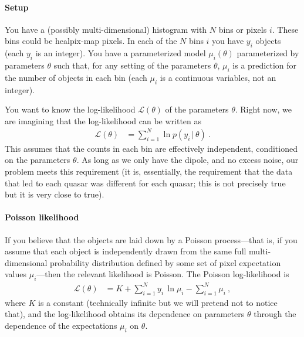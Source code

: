 \documentclass{article}
\newcommand{\given}{\,|\,}
\begin{document}
\paragraph{Setup}
You have a (possibly multi-dimensional) histogram with $N$ bins or pixels $i$.
These bins could be healpix-map pixels.
In each of the $N$ bins $i$ you have $y_i$ objects (each $y_i$ is an integer).
You have a parameterized model $\mu_i(\theta)$ parameterized by parameters $\theta$ such that, for any setting of the parameters $\theta$, $\mu_i$ is a prediction for the number of objects in each bin (each $\mu_i$ is a continuous variables, not an integer).

You want to know the log-likelihood $\mathscr{L}(\theta)$ of the parameters $\theta$.
Right now, we are imagining that the log-likelihood can be written as
\begin{align}
    \mathscr{L}(\theta) &= \sum_{i=1}^N \ln p(y_i\given\theta) ~.
\end{align}
This assumes that the counts in each bin are effectively independent, conditioned on the parameters $\theta$.
As long as we only have the dipole, and no excess noise, our problem meets this requirement (it is, essentially, the requirement that the data that led to each quasar was different for each quasar; this is not precisely true but it is very close to true).

\paragraph{Poisson likelihood}
If you believe that the objects are laid down by a Poisson process---that is, if you assume that each object is independently drawn from the same full multi-dimensional probability distribution defined by some set of pixel expectation values $\mu_i$---then the relevant likelihood is Poisson.
The Poisson log-likelihood is
\begin{align}
    \mathscr{L}(\theta) &= K + \sum_{i=1}^N y_i\,\ln\mu_i - \sum_{i=1}^N\mu_i \label{eq:Poiss}~,
\end{align}
where $K$ is a constant (technically infinite but we will pretend not to notice that),
and the log-likelihood obtains its dependence on parameters $\theta$ through the dependence of the expectations $\mu_i$ on $\theta$.
\end{document}
